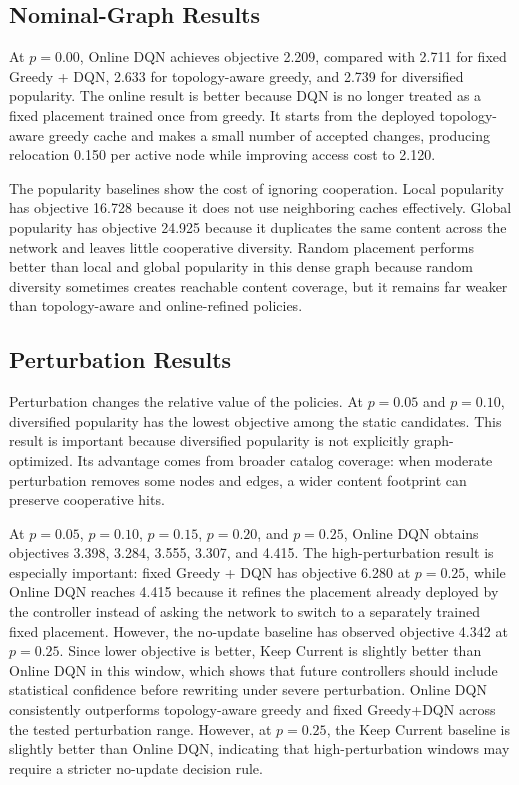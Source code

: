 




\subsection{Nominal-Graph Results}

At \(p=0.00\), Online DQN achieves objective 2.209, compared with 2.711 for fixed Greedy + DQN, 2.633 for topology-aware greedy, and 2.739 for diversified popularity. The online result is better because DQN is no longer treated as a fixed placement trained once from greedy. It starts from the deployed topology-aware greedy cache and makes a small number of accepted changes, producing relocation 0.150 per active node while improving access cost to 2.120.

The popularity baselines show the cost of ignoring cooperation. Local popularity has objective 16.728 because it does not use neighboring caches effectively. Global popularity has objective 24.925 because it duplicates the same content across the network and leaves little cooperative diversity. Random placement performs better than local and global popularity in this dense graph because random diversity sometimes creates reachable content coverage, but it remains far weaker than topology-aware and online-refined policies.

\subsection{Perturbation Results}

Perturbation changes the relative value of the policies. At \(p=0.05\) and \(p=0.10\), diversified popularity has the lowest objective among the static candidates. This result is important because diversified popularity is not explicitly graph-optimized. Its advantage comes from broader catalog coverage: when moderate perturbation removes some nodes and edges, a wider content footprint can preserve cooperative hits.

At \(p=0.05\), \(p=0.10\), \(p=0.15\), \(p=0.20\), and \(p=0.25\), Online DQN obtains objectives 3.398, 3.284, 3.555, 3.307, and 4.415. The high-perturbation result is especially important: fixed Greedy + DQN has objective 6.280 at \(p=0.25\), while Online DQN reaches 4.415 because it refines the placement already deployed by the controller instead of asking the network to switch to a separately trained fixed placement. However, the no-update baseline has observed objective 4.342 at \(p=0.25\). Since lower objective is better, Keep Current is slightly better than Online DQN in this window, which shows that future controllers should include statistical confidence before rewriting under severe perturbation.
Online DQN consistently outperforms topology-aware greedy and fixed Greedy+DQN across the tested perturbation range. However, at \(p=0.25\), the Keep Current baseline is slightly better than Online DQN, indicating that high-perturbation windows may require a stricter no-update decision rule.

